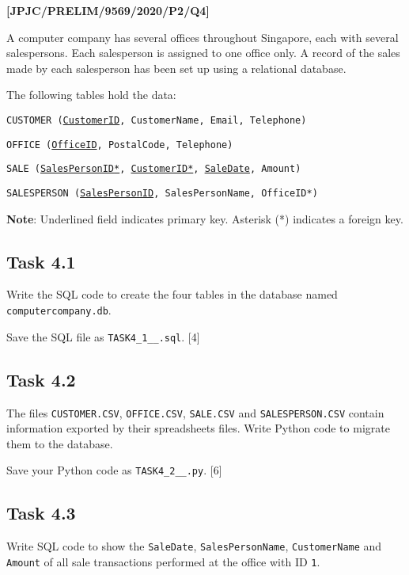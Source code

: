 \item \textbf{{[}JPJC/PRELIM/9569/2020/P2/Q4{]} }

A computer company has several offices throughout Singapore, each
with several salespersons. Each salesperson is assigned to one office
only. A record of the sales made by each salesperson has been set
up using a relational database. 

The following tables hold the data: 

\texttt{CUSTOMER (}\texttt{\uline{CustomerID}}\texttt{, CustomerName,
Email, Telephone) }

\texttt{OFFICE (}\texttt{\uline{OfficeID}}\texttt{, PostalCode,
Telephone) }

\texttt{SALE (}\texttt{\uline{SalesPersonID{*}}}\texttt{, }\texttt{\uline{CustomerID{*}}}\texttt{,
}\texttt{\uline{SaleDate}}\texttt{, Amount) }

\texttt{SALESPERSON (}\texttt{\uline{SalesPersonID}}\texttt{, SalesPersonName,
OfficeID{*}) }

\textbf{Note}: Underlined field indicates primary key. Asterisk ({*})
indicates a foreign key. 

\subsection*{Task 4.1 }

Write the SQL code to create the four tables in the database named
\texttt{computercompany.db}. 

Save the SQL file as \texttt{TASK4\_1\_<your class>\_<your name>.sql}.
\hfill{}{[}4{]}

\subsection*{Task 4.2 }

The files \texttt{CUSTOMER.CSV}, \texttt{OFFICE.CSV}, \texttt{SALE.CSV}
and \texttt{SALESPERSON.CSV} contain information exported by their
spreadsheets files. Write Python code to migrate them to the database. 

Save your Python code as \texttt{TASK4\_2\_<your class>\_<your name>.py}.
\hfill{} {[}6{]}

\subsection*{Task 4.3 }

Write SQL code to show the \texttt{SaleDate}, \texttt{SalesPersonName},
\texttt{CustomerName} and \texttt{Amount} of all sale transactions
performed at the office with ID \texttt{1}. 

